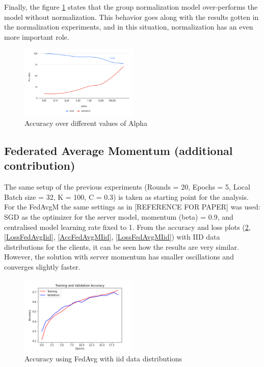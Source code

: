 \documentclass[twocolumn]{article}
\begin{document}
Finally, the figure \ref{AccAlpha} states that the group normalization model over-performs the model without normalization. This behavior goes along with the results gotten in the normalization experiments, and in this situation, normalization has an even more important role.


\begin{figure}
    \centering
    \includegraphics[width=0.5\textwidth,height=.3\textheight]{alphaAccuracy.png}
    \caption{Accuracy over different values of Alpha}
    \label{AccAlpha} 
\end{figure}


\subsection{Federated Average Momentum (additional contribution)}

The same setup of the previous experiments (Rounds = 20, Epochs = 5, Local Batch size = 32, K = 100, C = 0.3) is taken as starting point for the analysis.
For the FedAvgM the same settings as in [REFERENCE FOR PAPER] was used: SGD as the optimizer for the server model,  momentum (beta) = 0.9, and centralised model learning rate fixed to 1.
From the accuracy and loss plots (\ref{AccFedAvgIid}, \ref{LossFedAvgIid}, \ref{AccFedAvgMIid}, \ref{LossFedAvgMIid}) with IID data distributions for the clients, it can be seen how the results are very similar. However, the solution with server momentum has smaller oscillations and converges slightly faster. 

\begin{figure}
    \centering
    \includegraphics[width=0.5\textwidth,height=.3\textheight]{4_AccuracyFedAvg_iid.png}
    \caption{Accuracy using FedAvg with iid data distributions}
     \label{AccFedAvgIid} 
\end{figure}
\end{document}

